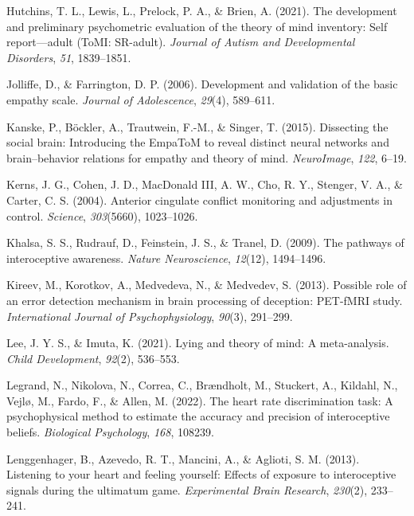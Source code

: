 \documentclass[
  man,mask,floatsintext]{apa6}
\newlength{\cslhangindent}
\newlength{\cslentryspacingunit} %
\newenvironment{CSLReferences}[2] %
 {%
  \setlength{\parindent}{0pt}
  \ifodd #1
  \let\oldpar\par
  \def\par{\hangindent=\cslhangindent\oldpar}
  \fi
  \setlength{\parskip}{#2\cslentryspacingunit}
 }%
 {}
\begin{document}
\begin{CSLReferences}{1}{0}
\leavevmode{}%
Hutchins, T. L., Lewis, L., Prelock, P. A., \& Brien, A. (2021). The development and preliminary psychometric evaluation of the theory of mind inventory: Self report---adult (ToMI: SR-adult). \emph{Journal of Autism and Developmental Disorders}, \emph{51}, 1839--1851.

\leavevmode{}%
Jolliffe, D., \& Farrington, D. P. (2006). Development and validation of the basic empathy scale. \emph{Journal of Adolescence}, \emph{29}(4), 589--611.

\leavevmode{}%
Kanske, P., Böckler, A., Trautwein, F.-M., \& Singer, T. (2015). Dissecting the social brain: Introducing the EmpaToM to reveal distinct neural networks and brain--behavior relations for empathy and theory of mind. \emph{NeuroImage}, \emph{122}, 6--19.

\leavevmode{}%
Kerns, J. G., Cohen, J. D., MacDonald III, A. W., Cho, R. Y., Stenger, V. A., \& Carter, C. S. (2004). Anterior cingulate conflict monitoring and adjustments in control. \emph{Science}, \emph{303}(5660), 1023--1026.

\leavevmode{}%
Khalsa, S. S., Rudrauf, D., Feinstein, J. S., \& Tranel, D. (2009). The pathways of interoceptive awareness. \emph{Nature Neuroscience}, \emph{12}(12), 1494--1496.

\leavevmode{}%
Kireev, M., Korotkov, A., Medvedeva, N., \& Medvedev, S. (2013). Possible role of an error detection mechanism in brain processing of deception: PET-fMRI study. \emph{International Journal of Psychophysiology}, \emph{90}(3), 291--299.

\leavevmode{}%
Lee, J. Y. S., \& Imuta, K. (2021). Lying and theory of mind: A meta-analysis. \emph{Child Development}, \emph{92}(2), 536--553.

\leavevmode{}%
Legrand, N., Nikolova, N., Correa, C., Brændholt, M., Stuckert, A., Kildahl, N., Vejlø, M., Fardo, F., \& Allen, M. (2022). The heart rate discrimination task: A psychophysical method to estimate the accuracy and precision of interoceptive beliefs. \emph{Biological Psychology}, \emph{168}, 108239.

\leavevmode{}%
Lenggenhager, B., Azevedo, R. T., Mancini, A., \& Aglioti, S. M. (2013). Listening to your heart and feeling yourself: Effects of exposure to interoceptive signals during the ultimatum game. \emph{Experimental Brain Research}, \emph{230}(2), 233--241.


\end{CSLReferences}
\end{document}
